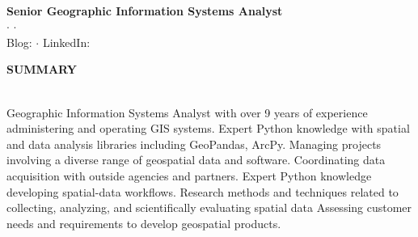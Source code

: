 \documentclass[letterpaper]{article}
\newcommand{\lineunder} {
        \vspace*{-8pt} \\
        \hspace*{-18pt} \hrulefill \\
    }
\newcommand{\header} [1] {
        \vspace{9pt}
        {\hspace*{-18pt}\vspace*{6pt} \large \textbf {#1}}
        \vspace*{-6pt} \lineunder
        \vspace{2pt}
    }
\newcommand{\cvprofile}[7]{ %
        \begin{center}
            {\Huge \textbf {#1}}\\
            \vspace{4pt}
            {\large \textbf {#2}}\\
            \vspace{4pt}
            #3 $\cdot$\enspace #4 $\cdot$\enspace #5\\
            Blog: #6
            $\cdot$\enspace
            LinkedIn: #7
        \end{center}
    }
\newcommand{\CVjobTitle}{Senior Geographic Information Systems Analyst}
\begin{document}



\vspace*{-30pt}

\cvprofile
    {\CVname}
    {\CVjobTitle}
    {\CVaddress}
    {\CVemail}
    {\CVphone}
    {\CVblogurl}
    {\CVlinkedin}

\vspace*{-6pt}



\header{SUMMARY}
Geographic Information Systems Analyst with over 9 years of experience administering and operating GIS systems.
Expert Python knowledge with spatial and data analysis libraries including GeoPandas, ArcPy.
Managing projects involving a diverse range of geospatial data and software.
Coordinating data acquisition with outside agencies and partners.
Expert Python knowledge developing spatial-data workflows.
Research methods and techniques related to collecting, analyzing, and scientifically evaluating spatial data
Assessing customer needs and requirements to develop geospatial products.
\end{document}
